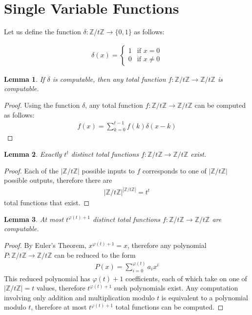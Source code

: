 \documentclass{article}
\def\zt{\mathbb{Z}/t\mathbb{Z}}
\newtheorem{lem}{Lemma}
\begin{document}
    \section{Single Variable Functions}

    Let us define the function $\delta: \zt\to \{0,1\}$ as follows:

    \begin{align}
        \delta(x) 
        = \left\{
            \begin{array}{cc}
                1 & \text{if } x = 0\\
                0 & \text{if } x \neq 0
            \end{array}
        \right.
    \end{align}

    \begin{lem}
        If $\delta$ is computable, then any total function 
        $f:\zt\to\zt$ is computable.
    \end{lem}
    \begin{proof}
        Using the function $\delta$, any total function $f:\zt\to\zt$ can be computed as follows:
        \begin{align}
            f(x) = \sum_{k = 0}^{t-1} f(k)\delta(x - k)
        \end{align}
    \end{proof}

    \begin{lem}
        Exactly $t^{t}$ distinct total functions $f:\zt\to\zt$ exist. 
    \end{lem}
    \begin{proof}
        Each of the $|\zt|$ possible inputs to $f$ corresponds to 
        one of $|\zt|$ possible outputs, therefore there are
        \begin{align}
            |\zt|^{|\zt|} = t^t
        \end{align}
        total functions that exist. 
    \end{proof}

    \begin{lem}
        At most $t^{\varphi(t) + 1}$ distinct total functions $f:\zt\to\zt$ are computable.
    \end{lem}
    \begin{proof}
        By Euler's Theorem, $x^{\varphi(t) + 1} = x$, 
        therefore any polynomial $P:\zt\to\zt$ can be reduced to the form
        \begin{align}
          P(x) = \sum_{i = 0}^{\varphi(t)} a_{i}x^{i}
        \end{align}
        This reduced polynomial has $\varphi(t) + 1$ coefficients, 
        each of which take on one of $|\zt| = t$ values,
        therefore $t^{\varphi(t) + 1}$ such polynomials exist. 
        Any computation involving only addition and multiplication modulo $t$
        is equivalent to a polynomial modulo $t$, therefore at most
        $t^{\varphi(t) + 1}$ total functions can be computed. 
    \end{proof}
    
\end{document}
